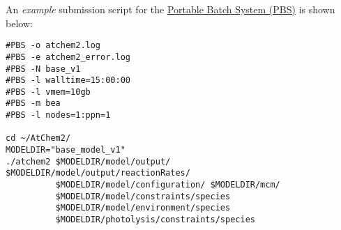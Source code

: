 An \emph{example} submission script for the
\href{https://en.wikipedia.org/wiki/Portable_Batch_System}{Portable
  Batch System (PBS)} is shown below:

\begin{verbatim}
#PBS -o atchem2.log
#PBS -e atchem2_error.log
#PBS -N base_v1
#PBS -l walltime=15:00:00
#PBS -l vmem=10gb
#PBS -m bea
#PBS -l nodes=1:ppn=1

cd ~/AtChem2/
MODELDIR="base_model_v1"
./atchem2 $MODELDIR/model/output/ $MODELDIR/model/output/reactionRates/
          $MODELDIR/model/configuration/ $MODELDIR/mcm/
          $MODELDIR/model/constraints/species
          $MODELDIR/model/environment/species
          $MODELDIR/photolysis/constraints/species
\end{verbatim}
